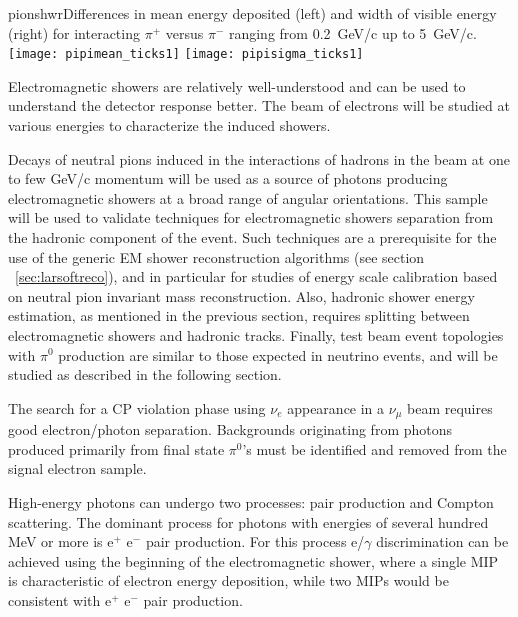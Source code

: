 \begin{description}
\begin{cdrfigure}{pionshwr}{Differences in mean energy deposited (left) and width of visible energy (right) 
for interacting $\pi^+$ versus $\pi^-$ ranging from 0.2~GeV/c up to 5~GeV/c. }
\texttt{[image: pipimean\_ticks1]}
\texttt{[image: pipisigma\_ticks1]}
\end{cdrfigure}


\item [Characterization of electromagnetic showers]


Electromagnetic showers are relatively well-understood and can be used to understand the detector response better. The beam of electrons will be studied at various energies to characterize the induced showers.

Decays of neutral pions induced in the interactions of hadrons in the beam at one to few GeV/c momentum
will be used as a source of photons producing electromagnetic showers at a broad range of angular orientations.
This sample will be used to validate techniques for electromagnetic showers separation from the hadronic
component of the event. Such techniques are a prerequisite for the use of the generic EM shower reconstruction
algorithms (see section ~\ref{sec:larsoftreco}), and in particular for studies of energy scale calibration
based on neutral pion invariant mass reconstruction. Also, hadronic shower energy estimation, as mentioned
in the previous section, requires splitting between electromagnetic showers and hadronic tracks. Finally,
test beam event topologies with $\pi^0$ production are similar to those expected in neutrino events, and
will be studied as described in the following section.

\item [Study of $e/\gamma$ separation capabilities]

The search for a CP violation phase using $\nu_e$ appearance 
in a $\nu_\mu$ beam requires good electron/photon separation.
Backgrounds originating from photons produced primarily from final state $\pi^0$'s must be identified and removed from the signal
electron sample. 

High-energy photons can undergo two processes: pair production and Compton scattering. 
The dominant process for photons with energies of several hundred MeV or more is 
e$^+$ e$^-$ pair production.
For this process e/$\gamma$ discrimination can be achieved using the beginning of the electromagnetic shower, where a single MIP is characteristic of electron energy deposition, while two MIPs would be consistent with e$^+$ e$^-$ pair production. 



\end{description}
